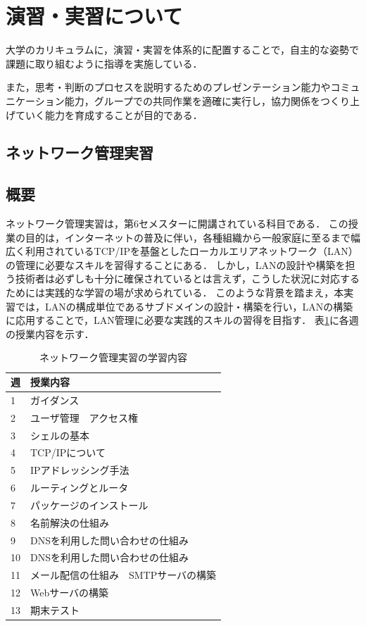 \documentclass[12pt,a4j,titlepage]{ltjsarticle}
\begin{document}
\section{演習・実習について}
大学のカリキュラムに，演習・実習を体系的に配置することで，自主的な姿勢で課題に取り組むように指導を実施している．

また，思考・判断のプロセスを説明するためのプレゼンテーション能力やコミュニケーション能力，グループでの共同作業を適確に実行し，協力関係をつくり上げていく能力を育成することが目的である．

\subsection{ネットワーク管理実習}
\subsection{概要}
ネットワーク管理実習は，第6セメスターに開講されている科目である．
この授業の目的は，インターネットの普及に伴い，各種組織から一般家庭に至るまで幅広く利用されているTCP/IPを基盤としたローカルエリアネットワーク（LAN）の管理に必要なスキルを習得することにある．
しかし，LANの設計や構築を担う技術者は必ずしも十分に確保されているとは言えず，こうした状況に対応するためには実践的な学習の場が求められている．
このような背景を踏まえ，本実習では，LANの構成単位であるサブドメインの設計・構築を行い，LANの構築に応用することで，LAN管理に必要な実践的スキルの習得を目指す．
表\ref{tb:kougi}に各週の授業内容を示す．

\begin{table}[htbp]
  \caption{ネットワーク管理実習の学習内容}
  \begin{center}
\begin{tabular}{ll}\hline
               週 & 授業内容 \\ \hline
               1 & ガイダンス\\
               2 & ユーザ管理　アクセス権\\
               3 & シェルの基本\\
               4 & TCP/IPについて\\
               5 & IPアドレッシング手法\\
               6 & ルーティングとルータ\\
               7 & パッケージのインストール\\
               8 & 名前解決の仕組み\\
               9 & DNSを利用した問い合わせの仕組み\\
              10 & DNSを利用した問い合わせの仕組み\\
              11 & メール配信の仕組み　SMTPサーバの構築\\
              12 & Webサーバの構築\\
              13 & 期末テスト\\
              \hline
               \end{tabular}
               \end{center}
               \label{tb:kougi}
               \end{table}
\end{document}
